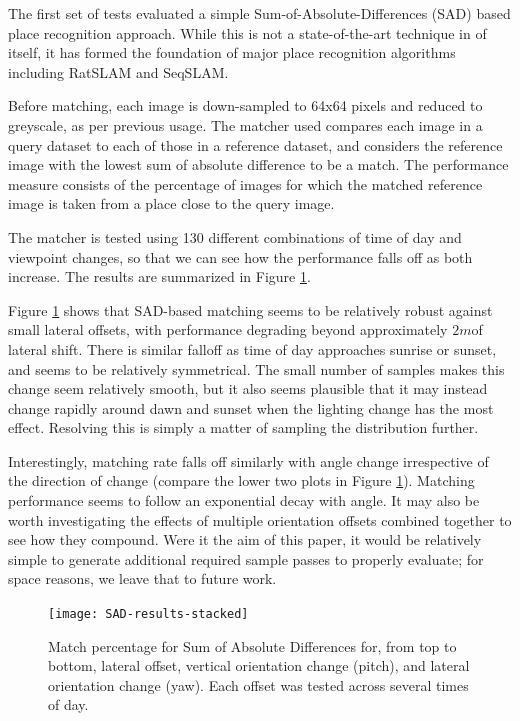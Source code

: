 \documentclass[letterpaper, 10 pt, conference]{ieeeconf}  %
\begin{document}
The first set of tests evaluated a simple Sum-of-Absolute-Differences (SAD) based place recognition approach. While this is not a state-of-the-art technique in of itself, it has formed the foundation of major place recognition algorithms including RatSLAM \cite{milford2010persistent} and SeqSLAM. 

Before matching, each image is down-sampled to 64x64 pixels and reduced to greyscale, as per previous usage. The matcher used compares each image in a query dataset to each of those in a reference dataset, and considers the reference image with the lowest sum of absolute difference to be a match. The performance measure consists of the percentage of images for which the matched reference image is taken from a place close to the query image.

The matcher is tested using 130 different combinations of time of day and viewpoint changes, so that we can see how the performance falls off as both increase. The results are summarized in Figure \ref{fig:sad-results-stacked}.

Figure \ref{fig:sad-results-stacked} shows that SAD-based matching seems to be relatively robust against small lateral offsets, with performance degrading beyond approximately $2m$of lateral shift. There is similar falloff as time of day approaches sunrise or sunset, and seems to be relatively symmetrical. The small number of samples makes this change seem relatively smooth, but it also seems plausible that it may instead change rapidly around dawn and sunset when the lighting change has the most effect. Resolving this is simply a matter of sampling the distribution further.

Interestingly, matching rate falls off similarly with angle change irrespective of the direction of change (compare the lower two plots in Figure \ref{fig:sad-results-stacked}). Matching performance seems to follow an exponential decay with angle. It may also be worth investigating the effects of multiple orientation offsets combined together to see how they compound. Were it the aim of this paper, it would be relatively simple to generate additional required sample passes to properly evaluate; for space reasons, we leave that to future work.

\begin{figure}[ht]
    \centering
    \texttt{[image: SAD-results-stacked]}
    \caption{Match percentage for Sum of Absolute Differences for, from top to bottom, lateral offset, vertical orientation change (pitch), and lateral orientation change (yaw). Each offset was tested across several times of day.}
    \label{fig:sad-results-stacked}
\end{figure}
\end{document}
